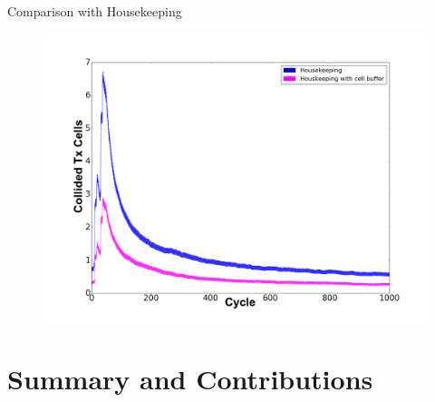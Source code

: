 \begin{withoutheadline}
\begin{frame}{Comparison with Housekeeping }

\begin{figure}[p]

\includegraphics[width=\linewidth]{figures/graph2.png}
\end{figure}



\end{frame}
\end{withoutheadline}



\section{Summary and Contributions}

